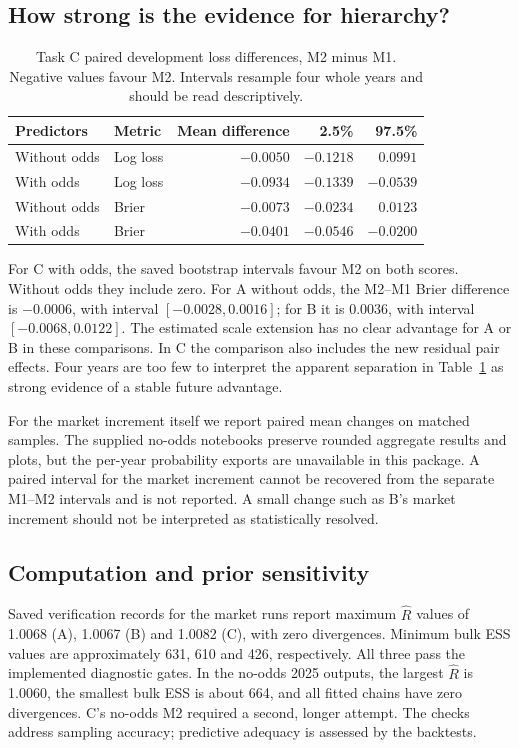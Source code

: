 \documentclass[11pt,a4paper]{article}
\begin{document}
\subsection{How strong is the evidence for hierarchy?}
\begin{table}[H]\centering\small
\caption{Task C paired development loss differences, M2 minus M1. Negative values favour M2. Intervals resample four whole years and should be read descriptively.}\label{tab:paired}
\begin{tabular}{llrrr}
\toprule
Predictors & Metric & Mean difference & 2.5\% & 97.5\%\\\midrule
Without odds & Log loss & $-0.0050$ & $-0.1218$ & $0.0991$\\
With odds & Log loss & $-0.0934$ & $-0.1339$ & $-0.0539$\\
Without odds & Brier & $-0.0073$ & $-0.0234$ & $0.0123$\\
With odds & Brier & $-0.0401$ & $-0.0546$ & $-0.0200$\\\bottomrule
\end{tabular}
\end{table}
For C with odds, the saved bootstrap intervals favour M2 on both scores. Without odds they include zero. For A without odds, the M2--M1 Brier difference is $-0.0006$, with interval $[-0.0028,0.0016]$; for B it is $0.0036$, with interval $[-0.0068,0.0122]$. The estimated scale extension has no clear advantage for A or B in these comparisons. In C the comparison also includes the new residual pair effects. Four years are too few to interpret the apparent separation in Table~\ref{tab:paired} as strong evidence of a stable future advantage.

For the market increment itself we report paired mean changes on matched samples. The supplied no-odds notebooks preserve rounded aggregate results and plots, but the per-year probability exports are unavailable in this package. A paired interval for the market increment cannot be recovered from the separate M1--M2 intervals and is not reported. A small change such as B's market increment should not be interpreted as statistically resolved.

\subsection{Computation and prior sensitivity}
Saved verification records for the market runs report maximum $\widehat R$ values of 1.0068 (A), 1.0067 (B) and 1.0082 (C), with zero divergences. Minimum bulk ESS values are approximately 631, 610 and 426, respectively. All three pass the implemented diagnostic gates. In the no-odds 2025 outputs, the largest $\widehat R$ is 1.0060, the smallest bulk ESS is about 664, and all fitted chains have zero divergences. C's no-odds M2 required a second, longer attempt. The checks address sampling accuracy; predictive adequacy is assessed by the backtests.
\end{document}
